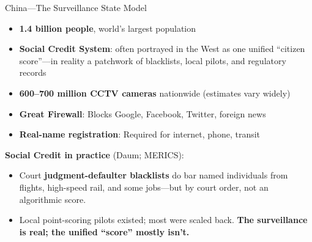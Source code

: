 ﻿\documentclass[aspectratio=169,11pt]{beamer}
\begin{document}
\begin{frame}{China---The Surveillance State Model}
\begin{objectionbox}
\small
\begin{itemize}
    \item \textbf{1.4 billion people}, world's largest population
    \item \textbf{Social Credit System}: often portrayed in the West as one unified ``citizen score''---in reality a patchwork of blacklists, local pilots, and regulatory records
    \item \textbf{600--700 million CCTV cameras} nationwide (estimates vary widely)
    \item \textbf{Great Firewall}: Blocks Google, Facebook, Twitter, foreign news
    \item \textbf{Real-name registration}: Required for internet, phone, transit
\end{itemize}
\end{objectionbox}

\vspace{0.2em}
\textbf{Social Credit in practice} (Daum; MERICS):
\begin{itemize}
    \item Court \textbf{judgment-defaulter blacklists} do bar named individuals from flights, high-speed rail, and some jobs---but by court order, not an algorithmic score.
    \item Local point-scoring pilots existed; most were scaled back. \textbf{The surveillance is real; the unified ``score'' mostly isn't.}
\end{itemize}
\end{frame}
\end{document}
